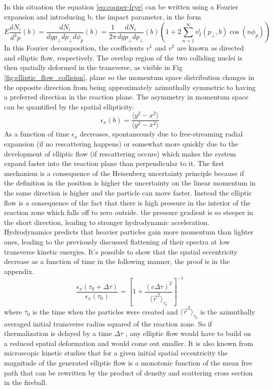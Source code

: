 \documentclass[12pt,a4paper]{book}
\begin{document}
	In this situation the equation \ref{eq:cooper-frye} can be written using a Fourier expansion and introducing b, the impact parameter, in the form
	\begin{equation}
		E \frac{dN_i}{d^3 p}(b)= \frac{dN_i}{dy p_\perp dp_\perp d\phi_p} (b) = \frac{1}{2\pi} \frac{dN_i}{dy p_\perp dp_\perp} (b) \left(1 + 2 \sum_{n=1}^{\infty} v_2^i(p_\perp,b) \cos(n\phi_p) \right)
	\end{equation}
	In this Fourier decomposition, the coefficients $v^1$ and $v^2$	are known as directed and elliptic flow, respectively. The overlap region of the two colliding nuclei is then spatially deformed in the transverse, as visible in Fig \ref{fig:elliptic_flow_collision}, plane so the momentum space distribution changes in the opposite direction from being approximately azimuthally symmetric to having a preferred direction in the reaction plane. The asymmetry in momentum space can be quantified by the spatial ellipticity:
	\begin{equation}
		\epsilon_x(b)=\frac{\langle y^2 - x^2\rangle}{\langle y^2 - x^2\rangle}
		\label{eq:anisotropy}
	\end{equation}
	As a function of time $\epsilon_x$ decreases, spontaneously due to free-streaming radial expansion (if no rescattering happens) or somewhat more quickly due to the development of elliptic flow (if rescattering occurs) which makes the system expand faster into the reaction plane than perpendicular to it. The first mechanism is a consequence of the Heisenberg uncertainty principle because if the definition in the position is higher the uncertainty on the linear momentum in the same direction is higher and the particle can move faster. Instead the elliptic flow is a consequence of the fact that there is high pressure in the interior of the reaction zone which falls off to zero outside. the pressure gradient is so steeper in the short direction, leading to stronger hydrodynamic acceleration. Hydrodynamics predicts that heavier particles gain more momentum than lighter ones, leading to the previously discussed flattening of their spectra at low transverse kinetic energies. It's possible to show that the spatial eccentricity decrease as a function of time in the following manner, the proof is in the appendix.
	\begin{equation}
		\frac{\epsilon_x(\tau_0 + \Delta \tau)}{\epsilon_x(\tau_0)} = \left[1+ \frac{(c \Delta \tau)^2}{\langle \vec{r}^2 \rangle_{\tau_0}} \right]^{-1}
	\end{equation}
	where $\tau_0$ is the time when the particles were created and $\langle \vec{r}^2 \rangle_{\tau_0}$ is the azimuthally averaged initial transverse radius squared of the reaction zone. So if thermalization is delayed by a time $\Delta \tau$ , any elliptic flow would have to build on a reduced spatial deformation and would come out smaller. It is also known from microscopic kinetic studies that for a given initial spatial eccentricity the magnitude of the generated elliptic flow is a monotonic function of the mean free path that can be rewritten by the product of density and scattering cross section in the fireball.
	
\end{document}
